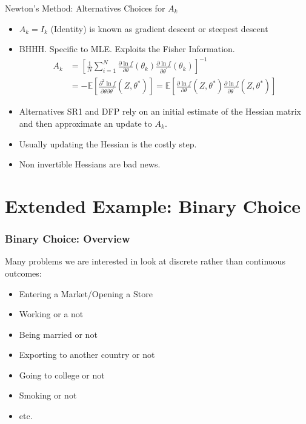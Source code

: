 \documentclass[aspectratio=169]{beamer}
\begin{document}
\begin{frame}{Newton's Method: Alternatives}
Choices for $A_k$
\begin{itemize}
\item $A_k= I_{k}$ (Identity) is known as \alert{gradient descent} or \alert{steepest descent}
\item BHHH. Specific to MLE. Exploits the \alert{Fisher Information}.
\begin{align*}
A _ { k } 
&= \left[ \frac { 1 } { N } \sum _ { i = 1 } ^ { N } \frac { \partial \ln f } { \partial \theta } \left( \theta _ { k } \right) \frac { \partial \ln f } { \partial \theta ^ { \prime } } \left( \theta _ { k } \right) \right] ^ { - 1 }\\
&=- \mathbb { E } \left[ \frac { \partial ^ { 2 } \ln f } { \partial \theta \partial \theta ^ { \prime } } \left( Z , \theta ^ { * } \right) \right] 
= \mathbb { E } \left[ \frac { \partial \ln f } { \partial \theta } \left( Z , \theta ^ { * } \right) \frac { \partial \ln f } { \partial \theta ^ { \prime } } \left( Z , \theta ^ { * } \right) \right]
\end{align*}
\item Alternatives \alert{SR1} and \alert{DFP} rely on an initial estimate of the Hessian matrix and then approximate an update to $A_k$.
\item Usually updating the Hessian is the costly step.
\item Non invertible Hessians are bad news.
\end{itemize}
\end{frame}

\section{Extended Example: Binary Choice}
\begin{frame}
\frametitle{Binary Choice: Overview}
Many problems we are interested in look at discrete rather than continuous outcomes:
\begin{itemize}
\item Entering a Market/Opening a Store
\item Working or a not
\item Being married or not
\item Exporting to another country or not
\item Going to college or not
\item Smoking or not
\item etc.
\end{itemize}
\end{frame}
\end{document}
